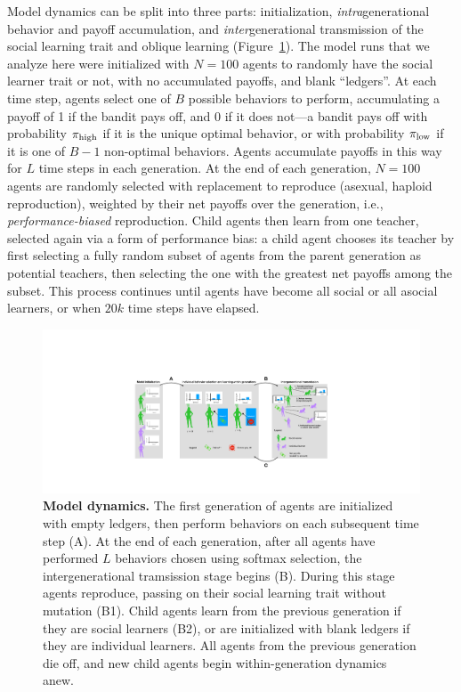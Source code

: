 \documentclass[letterpaper,11.5pt]{scrartcl}
\begin{document}
Model dynamics can be split into three parts: initialization,
\emph{intra}generational behavior and payoff accumulation, and
\emph{inter}generational transmission of the social learning trait and oblique
learning (Figure~\ref{fig:IntraInterGenerationalDynamics}). 
The model runs that we analyze here were initialized with $N=100$ agents
to randomly have the social learner trait or not, with no accumulated payoffs, and
blank ``ledgers''. At each time step, agents select one of $B$ possible behaviors
to perform, accumulating a payoff of 1 if the bandit pays off, and 0 if it does
not---a bandit pays off with probability $\pi_{\mathrm{high}}$ if it is the unique optimal
behavior, or with probability $\pi_{\mathrm{low}}$ if it is one of $B-1$ non-optimal
behaviors. Agents accumulate payoffs in this way for $L$ time steps in each
generation. At the end of each generation, $N=100$ agents are randomly selected with
replacement to reproduce (asexual, haploid reproduction), 
weighted by their net payoffs over the generation,
i.e., \emph{performance-biased} reproduction. Child agents then learn from 
one teacher, selected again via a form of performance bias: a child agent chooses
its teacher by first selecting a fully random subset of agents from the 
parent generation as potential teachers, then selecting the one with the 
greatest net payoffs among the subset. This process continues until agents
have become all social or all asocial learners, or when $20k$ time steps have
elapsed. 

\begin{figure}
  \caption{\textbf{Model dynamics.} 
    The first generation of agents are initialized with empty ledgers, 
    then perform behaviors on each subsequent time step (A). At the end
    of each generation, after all agents have performed $L$ behaviors
    chosen using softmax selection, the intergenerational tramsission stage
    begins (B). During this stage agents reproduce, passing on their social
    learning trait without mutation (B1). Child agents learn from
    the previous generation if they are social learners (B2), or are initialized
    with blank ledgers if they are individual learners. All agents from the previous
    generation die off, and new child agents begin within-generation dynamics anew.}
  \label{fig:IntraInterGenerationalDynamics}
\hspace{-2em}
    \includegraphics[width=1.1\textwidth]{Figures/IntraInterGenerationalDynamics.pdf}
\end{figure}
\end{document}
